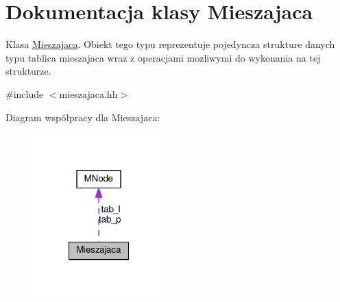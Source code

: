 \hypertarget{class_mieszajaca}{\section{Dokumentacja klasy Mieszajaca}
\label{class_mieszajaca}
}


Klasa \hyperlink{class_mieszajaca}{Mieszajaca}. Obiekt tego typu reprezentuje pojedyncza strukture danych typu tablica mieszajaca wraz z operacjami mozliwymi do wykonania na tej strukturze.  




{\ttfamily \#include $<$mieszajaca.\-hh$>$}



Diagram współpracy dla Mieszajaca\-:\nopagebreak
\begin{figure}[H]
\begin{center}
\leavevmode
\includegraphics[width=144pt]{class_mieszajaca__coll__graph}
\end{center}
\end{figure}
